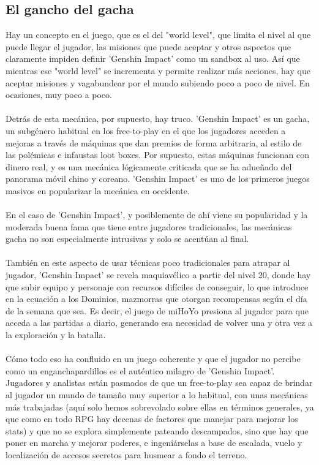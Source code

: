 \documentclass[osajnl,twocolumn,showpacs,superscriptaddress,10pt]{revtex4-2}
\begin{document}
    \subsection{El gancho del gacha}
    Hay un concepto en el juego, que es el del "world level", que limita el nivel al que puede llegar el jugador, las misiones que puede aceptar y otros aspectos que claramente impiden definir 'Genshin Impact' como un sandbox al uso. Así que mientras ese "world level" se incrementa y permite realizar más acciones, hay que aceptar misiones y vagabundear por el mundo subiendo poco a poco de nivel. En ocasiones, muy poco a poco.
    \\\\
    Detrás de esta mecánica, por supuesto, hay truco. 'Genshin Impact' es un gacha, un subgénero habitual en los free-to-play en el que los jugadores acceden a mejoras a través de máquinas que dan premios de forma arbitraria, al estilo de las polémicas e infaustas loot boxes. Por supuesto, estas máquinas funcionan con dinero real, y es una mecánica lógicamente criticada que se ha adueñado del panorama móvil chino y coreano. 'Genshin Impact' es uno de los primeros juegos masivos en popularizar la mecánica en occidente.
    \\\\
    En el caso de 'Genshin Impact', y posiblemente de ahí viene su popularidad y la moderada buena fama que tiene entre jugadores tradicionales, las mecánicas gacha no son especialmente intrusivas y solo se acentúan al final.
    \\\\ 
    También en este aspecto de usar técnicas poco tradicionales para atrapar al jugador, 'Genshin Impact' se revela maquiavélico a partir del nivel 20, donde hay que subir equipo y personaje con recursos difíciles de conseguir, lo que introduce en la ecuación a los Dominios, mazmorras que otorgan recompensas según el día de la semana que sea. Es decir, el juego de miHoYo presiona al jugador para que acceda a las partidas a diario, generando esa necesidad de volver una y otra vez a la exploración y la batalla.
    \\\\
    Cómo todo eso ha confluido en un juego coherente y que el jugador no percibe como un enganchapardillos es el auténtico milagro de 'Genshin Impact'. Jugadores y analistas están pasmados de que un free-to-play sea capaz de brindar al jugador un mundo de tamaño muy superior a lo habitual, con unas mecánicas más trabajadas (aquí solo hemos sobrevolado sobre ellas en términos generales, ya que como en todo RPG hay decenas de factores que manejar para mejorar los stats) y que no se explora simplemente pateando descampados, sino que hay que poner en marcha y mejorar poderes, e ingeniárselas a base de escalada, vuelo y localización de accesos secretos para husmear a fondo el terreno\cite{xataka}.
\end{document}
